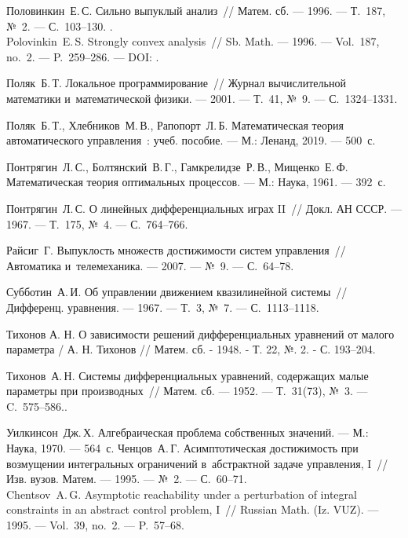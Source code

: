 \documentclass[../main.tex]{subfiles}
\begin{document}
\begin{thebibliography}{99}
Половинкин~Е.\,С. Сильно выпуклый анализ~// Матем. сб. --- 1996. --- Т.~187, №~2. --- С.~103--130.
 .
\\
Polovinkin~E.\,S. Strongly convex analysis~// Sb. Math. --- 1996. --- Vol.~187, no.~2. --- P.~259--286. --- DOI: .

Поляк~Б.\,Т. Локальное программирование~// Журнал вычислительной математики и~математической физики. --- 2001. --- Т.~41, №~9. --- С.~1324--1331.

Поляк~Б.\,Т., Хлебников~М.\,В., Рапопорт~Л.\,Б. Математическая теория автоматического управления~: учеб. пособие. --- М.: Ленанд, 2019. --- 500~с.

Понтрягин~Л.\,С., Болтянский~В.\,Г., Гамкрелидзе~Р.\,В., Мищенко~Е.\,Ф. Математическая теория оптимальных процессов. --- М.: Наука, 1961. --- 392~с.

Понтрягин~Л.\,С. О линейных дифференциальных играх II~// Докл. АН СССР. --- 1967. --- Т.~175, №~4. --- С.~764--766.


Райсиг~Г. Выпуклость множеств достижимости систем управления~// Автоматика и~телемеханика. --- 2007. --- №~9. --- С.~64--78.

Субботин~А.\,И. Об управлении движением квазилинейной системы~// Дифференц. уравнения. --- 1967. --- Т.~3, №~7. --- С.~1113--1118.

Тихонов А. Н. О зависимости решений дифференциальных уравнений от малого параметра / А. Н. Тихонов // Матем. сб. - 1948. - Т. 22, №. 2. - С. 193–204.

Тихонов~А.\,Н. Системы дифференциальных уравнений, содержащих малые параметры при производных~// Матем. сб. --- 1952. --- Т.~31(73), №~3. --- C.~575--586..

Уилкинсон~Дж.\,Х. Алгебраическая проблема собственных значений. --- М.: Наука, 1970. --- 564~с.
Ченцов~А.\,Г. Асимптотическая достижимость при возмущении интегральных ограничений в~абстрактной задаче управления, I~// Изв. вузов. Матем. --- 1995. --- №~2. --- С.~60--71.
\\
Chentsov~A.\,G. Asymptotic reachability under a perturbation of integral constraints in an abstract control problem, I~// Russian Math. (Iz. VUZ). --- 1995. --- Vol.~39, no.~2. --- P.~57--68.


\end{thebibliography}
\end{document}
